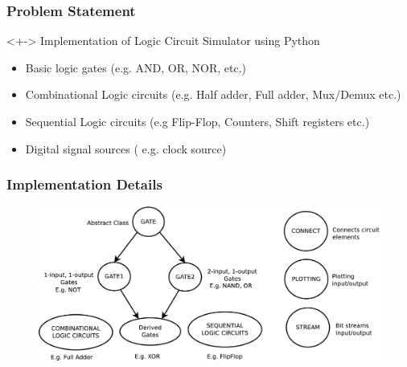 \documentclass[10pt,red]{beamer}
\begin{document}
\begin{frame}
\titlepage
\end{frame}
% 

\begin{frame}
 \frametitle{Problem Statement}
  

\begin{block}<+->{}
\qquad \qquad Implementation of Logic Circuit Simulator using Python
\end{block}

\begin{itemize}
 \item Basic logic gates (e.g. AND, OR, NOR, etc.)
 \item Combinational Logic circuits (e.g. Half adder, Full adder, Mux/Demux etc.)
 \item Sequential Logic circuits (e.g Flip-Flop, Counters, Shift registers etc.)
 \item Digital signal sources ( e.g. clock source)

\end{itemize}


\end{frame}


\begin{frame}
 \frametitle{Implementation Details}
  \begin{figure}
   \begin{center}
   \includegraphics[scale=0.3]{class.png}
  \end{center}
  \end{figure}

\end{frame}
\end{document}
